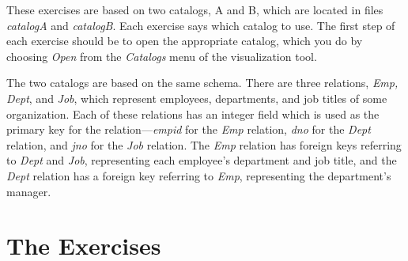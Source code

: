 These exercises are based on two catalogs, A and B, which are located in files
{\em catalogA} and {\em catalogB}.  Each exercise says which catalog to use.  
The first
step of each exercise should be to open the appropriate catalog, which you do
by choosing {\em Open} from the {\em Catalogs} menu of the 
visualization tool.

The two catalogs are based on the same schema.  There are three
relations, {\em Emp, Dept}, and {\em Job}, which represent employees,
departments, and job titles of some organization.  Each of these
relations has an integer field which is used as the primary key for
the relation---{\em empid} for the {\em Emp} relation, {\em dno} for
the {\em Dept} relation, and {\em jno} for the {\em Job} relation.  The
{\em Emp} relation has foreign keys referring to {\em Dept} and {\em
Job}, representing each employee's department and job title, and the
{\em Dept} relation has a foreign key referring to {\em Emp},
representing the department's manager.

\section{The Exercises}

